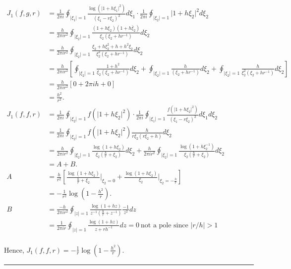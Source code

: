 \documentclass[twoside]{article}
\newenvironment{proof}{{\bf Proof:}}{\hfill\rule{2mm}{2mm}}
\begin{document}
\begin{proof}
	\begin{equation}
		\begin{split}
			J_1(f,g,r)&=\frac{1}{2\pi i}\oint_{\lvert\xi_1\rvert=1}\frac{\log(\lvert 1+h\xi_1\rvert^2)}{(\xi_1-r\xi_2)^2}d\xi_1\cdot\frac{1}{2\pi i}\oint_{\lvert\xi_2\rvert=1}\lvert 1+h\xi_2\rvert^2d\xi_2\\
			&=\frac{h}{2\pi ir^2}\oint_{\lvert\xi_2\rvert=1}\frac{(1+h\xi_2)(1+h\bar{\xi}_2)}{\xi_2(\xi_2+hr^{-1})}d\xi_2\\
			&=\frac{h}{2\pi ir^2}\oint_{\lvert\xi_2\rvert=1}\frac{\xi_2+h\xi_2^2+h+h^2\xi_2}{\xi_2^2(\xi_2+hr^{-1})}d\xi_2\\
			&=\frac{h}{2\pi ir^2}\left[\oint_{\lvert\xi_2\rvert=1}\frac{1+h^2}{\xi_2(\xi_2+hr^{-1})}d\xi_2+\oint_{\lvert\xi_2\rvert=1}\frac{h}{(\xi_2+hr^{-1})}d\xi_2+\oint_{\lvert\xi_2\rvert=1}\frac{h}{\xi_2^2(\xi_2+hr^{-1})}d\xi_2\right]\\
			&=\frac{h}{2\pi i r^2}\left[0+2\pi ih + 0\right]\\
			&=\frac{h^2}{r^2}.\\
			J_1(f,f,r)&=\frac{1}{2\pi i}\oint_{\lvert\xi_2\rvert=1}f(\lvert 1+h\xi_2\rvert^2)\cdot \frac{1}{2\pi i}\oint_{\lvert\xi_1\rvert=1}\frac{f(\lvert 1+h\xi_2\rvert^2)}{(\xi_1-r\xi_2)^2}d\xi_1d\xi_2\\
			&=\frac{1}{2\pi i}\oint_{\lvert\xi_2\rvert=1}f(\lvert 1+h\xi_2\rvert^2)\frac{h}{r\xi_2(r\xi_2+h)}d\xi_2\\
			&= \frac{h}{2\pi ir^2}\oint_{\lvert\xi_2\rvert=1}\frac{\log(1+h\xi_2)}{\xi_2\left(\frac{h}r+\xi_2\right)}d\xi_2+\frac{h}{2\pi ir^2}\oint_{\lvert\xi_2\rvert=1}\frac{\log(1+h\xi_2^{-1})}{\xi_2\left(\frac{h}r +\xi_2\right)}d\xi_2\\
			&=A+B.\\
			A&=\frac{h}{r^2}\left[\frac{\log(1+h\xi_2)}{\frac{h}{r}+\xi_2}\Bigg\lvert_{\xi_2=0}+\frac{\log(1+h\xi_2)}{\xi_2}\Bigg\lvert_{\xi_2=-\frac{h}{r}}\right]\\
			&=-\frac{1}{r^2}\log\left(1-\frac{h^2}{r}\right).\\
			B&=\frac{-h}{2\pi ir^2}\oint_{\lvert z\rvert=1}\frac{\log(1+hz)}{z^{-1}\left(\frac{h}{r}+z^{-1}\right)}\frac{-1}{z^2}dz\\
			&=\frac{1}{2\pi ir}\oint_{\lvert z\rvert=1}\frac{\log(1+hz)}{z+rh^{-1}}dz=0\ \text{not a pole since $\lvert r/h\rvert >1$}\\
		\end{split}
	\end{equation}
	
	Hence, $J_1(f,f,r)=-\frac{1}{r}\log(1-\frac{h^2}{r}).$
	

\end{proof}
\end{document}
